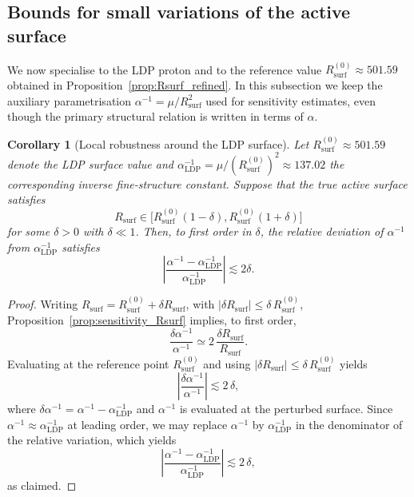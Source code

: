 \documentclass[11pt,a4paper]{article}
\theoremstyle{plain}
\newtheorem{corollary}{Corollary}
\theoremstyle{definition}
\theoremstyle{remark}
\begin{document}
\subsection{Bounds for small variations of the active surface}

We now specialise to the LDP proton and to the reference value
\(R_{\mathrm{surf}}^{(0)} \approx 501.59\) obtained in Proposition~\ref{prop:Rsurf_refined}. In this subsection we keep the auxiliary parametrisation \(\alpha^{-1} = \mu / R_{\mathrm{surf}}^2\) used for sensitivity estimates, even though the primary structural relation is written in terms of \(\alpha\).


\begin{corollary}[Local robustness around the LDP surface]
  \label{cor:local_robustness}
  Let \(R_{\mathrm{surf}}^{(0)} \approx 501.59\) denote the LDP surface value and
  \(\alpha^{-1}_{\mathrm{LDP}} = \mu / (R_{\mathrm{surf}}^{(0)})^2 \approx 137.02\) the
  corresponding inverse fine-structure constant. Suppose that the true active surface satisfies
  \[
    R_{\mathrm{surf}} \in \bigl[ R_{\mathrm{surf}}^{(0)}(1 - \delta),
                               R_{\mathrm{surf}}^{(0)}(1 + \delta) \bigr]
  \]
  for some \(\delta > 0\) with \(\delta \ll 1\). Then, to first order in \(\delta\), the relative deviation of \(\alpha^{-1}\) from \(\alpha^{-1}_{\mathrm{LDP}}\) satisfies
  \[
    \left| \frac{\alpha^{-1} - \alpha^{-1}_{\mathrm{LDP}}}{\alpha^{-1}_{\mathrm{LDP}}} \right|
    \lesssim 2\delta.
  \]
\end{corollary}

\begin{proof}
  Writing \(R_{\mathrm{surf}} = R_{\mathrm{surf}}^{(0)} + \delta R_{\mathrm{surf}}\),
  with \(|\delta R_{\mathrm{surf}}| \leq \delta\, R_{\mathrm{surf}}^{(0)}\),
  Proposition~\ref{prop:sensitivity_Rsurf} implies, to first order,
  \[
    \frac{\delta \alpha^{-1}}{\alpha^{-1}}
    \simeq 2\,\frac{\delta R_{\mathrm{surf}}}{R_{\mathrm{surf}}}.
  \]
  Evaluating at the reference point \(R_{\mathrm{surf}}^{(0)}\) and using
  \(|\delta R_{\mathrm{surf}}| \leq \delta\, R_{\mathrm{surf}}^{(0)}\) yields
  \[
    \left| \frac{\delta \alpha^{-1}}{\alpha^{-1}} \right|
    \lesssim 2\,\delta,
  \]
  where \(\delta \alpha^{-1} = \alpha^{-1} - \alpha^{-1}_{\mathrm{LDP}}\) and
  \(\alpha^{-1}\) is evaluated at the perturbed surface.
  Since \(\alpha^{-1} \approx \alpha^{-1}_{\mathrm{LDP}}\) at leading order, we may
  replace \(\alpha^{-1}\) by \(\alpha^{-1}_{\mathrm{LDP}}\) in the denominator of the
  relative variation, which yields
  \[
    \left| \frac{\alpha^{-1} - \alpha^{-1}_{\mathrm{LDP}}}{\alpha^{-1}_{\mathrm{LDP}}} \right|
    \lesssim 2\,\delta,
  \]
  as claimed.
\end{proof}
\end{document}
